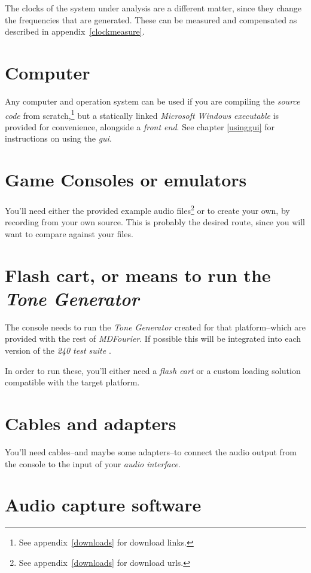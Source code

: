 \documentclass[10pt,a4paper]{report}
\newcommand{\ac}[1]{\textit{\mbox{\acrshort{#1}}}}
\begin{document}
\begin{appendices}
The clocks of the system under analysis are a different matter, since they change the frequencies that are generated. These can be measured and compensated as described in appendix~\ref{clockmeasure}.

\section{Computer}

Any computer and operation system can be used if you are compiling the \textit{source code} from scratch,\footnote{See appendix~\ref{downloads} for download links.} but a statically linked \textit{Microsoft Windows executable} is provided for convenience, alongside a \textit{front end}. See chapter \ref{usinggui} for instructions on using the \ac{gui}.

\section{Game Consoles or emulators}

You'll need either the provided example audio files\footnote{See appendix~\ref{downloads} for download urls.} or to create your own, by recording from your own source. This is probably the desired route, since you will want to compare against your files.

\section{Flash cart, or means to run the \textit{Tone Generator}}

The console needs to run the \textit{Tone Generator} created for that platform--which are provided with the rest of \textit{MDFourier}. If possible this will be integrated into each version of the \textit{240 test suite} \cite{240pSuite}.

In order to run these, you'll either need a \textit{flash cart} or a custom loading solution compatible with the target platform.

\section{Cables and adapters}

You'll need cables--and maybe some adapters--to connect the audio output from the console to the input of your \textit{audio interface}.

\section{Audio capture software}


\end{appendices}
\end{document}
